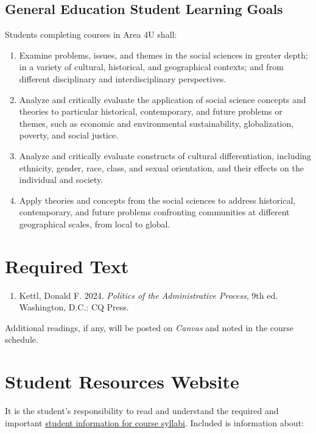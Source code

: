 \documentclass[12pt]{article}
\begin{document}
\subsection*{General Education Student Learning Goals}
Students completing courses in Area 4U shall:
\begin{enumerate}
    \item Examine problems, issues, and themes in the social sciences in greater depth; in a variety of cultural, historical, and geographical contexts; and from different disciplinary and interdisciplinary perspectives.
    \item Analyze and critically evaluate the application of social science concepts and theories to particular historical, contemporary, and future problems or themes, such as economic and environmental sustainability, globalization, poverty, and social justice.
    \item Analyze and critically evaluate constructs of cultural differentiation, including ethnicity, gender, race, class, and sexual orientation, and their effects on the individual and society.
    \item Apply theories and concepts from the social sciences to address historical, contemporary, and future problems confronting communities at different geographical scales, from local to global.
\end{enumerate}

\section*{Required Text}

\begin{enumerate}
    \item Kettl, Donald F. 2024. \emph{Politics of the Administrative Process}, 9th ed. Washington, D.C.: CQ Press.
\end{enumerate}

\noindent Additional readings, if any, will be posted on \emph{Canvas} and noted in the course schedule.

\section*{Student Resources Website}
It is the student's responsibility to read and understand the required and important \href{https://fdc.fullerton.edu/teaching/student-info-syllabi.html}{student information for course syllabi}. Included is information about:
\end{document}
